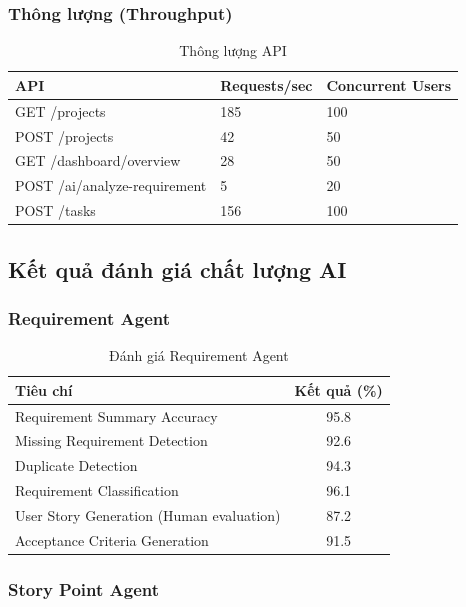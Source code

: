 \documentclass[12pt,a4paper]{report}
\begin{document}
\subsubsection{Thông lượng (Throughput)}

\begin{table}[H]
\centering
\caption{Thông lượng API}
\begin{tabular}{|p{5cm}|p{3cm}|p{3cm}|}
\hline
\textbf{API} & \textbf{Requests/sec} & \textbf{Concurrent Users} \\
\hline
GET /projects & 185 & 100 \\
\hline
POST /projects & 42 & 50 \\
\hline
GET /dashboard/overview & 28 & 50 \\
\hline
POST /ai/analyze-requirement & 5 & 20 \\
\hline
POST /tasks & 156 & 100 \\
\hline
\end{tabular}
\label{tab:api_throughput}
\end{table}

\subsection{Kết quả đánh giá chất lượng AI}

\subsubsection{Requirement Agent}

\begin{table}[H]
\centering
\caption{Đánh giá Requirement Agent}
\begin{tabular}{|p{5cm}|c|}
\hline
\textbf{Tiêu chí} & \textbf{Kết quả (\%)} \\
\hline
Requirement Summary Accuracy & 95.8 \\
\hline
Missing Requirement Detection & 92.6 \\
\hline
Duplicate Detection & 94.3 \\
\hline
Requirement Classification & 96.1 \\
\hline
User Story Generation (Human evaluation) & 87.2 \\
\hline
Acceptance Criteria Generation & 91.5 \\
\hline
\end{tabular}
\label{tab:req_agent_results}
\end{table}

\subsubsection{Story Point Agent}
\end{document}
